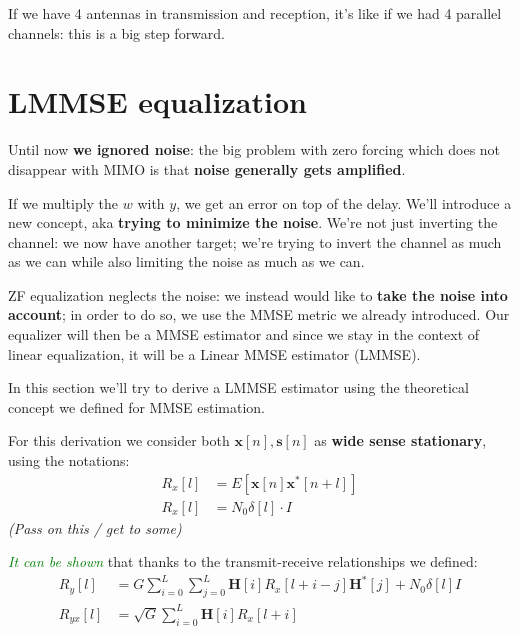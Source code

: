 \documentclass[a4paper, 12pt]{book}
\begin{document}
If we have 4 antennas in transmission and reception, it's like if we had 4 parallel channels: this is a big step forward.

\section{LMMSE equalization}

\begin{center}
\end{center}

Until now \textbf{we ignored noise}: the big problem with zero forcing which does not disappear with MIMO is that \textbf{noise generally gets amplified}.

If we multiply the $w$ with $y$, we get an error on top of the delay. We'll introduce a new concept, aka \textbf{trying to minimize the noise}. We're not just inverting the channel: we now have another target; we're trying to invert the channel as much as we can while also limiting the noise as much as we can.

ZF equalization neglects the noise: we instead would like to \textbf{take the noise into account}; in order to do so, we use the MMSE metric we already introduced. Our equalizer will then be a MMSE estimator and since we stay in the context of linear equalization, it will be a Linear MMSE estimator (LMMSE).

In this section we'll try to derive a LMMSE estimator using the theoretical concept we defined for MMSE estimation.

For this derivation we consider both $\mathbf{x}[n], \mathbf{s}[n]$ as \textbf{wide sense stationary}, using the notations:
\begin{align}
    R_x[l] &= E[\mathbf{x}[n]\mathbf{x}^*[n+l]] \\
    R_x[l] &= N_0 \delta[l] \cdot I
\end{align}
\textit{\footnotesize (Pass on this / get to some)}

\textit{\textcolor{green}{It can be shown}} that thanks to the transmit-receive relationships we defined:
\begin{align}
    R_y[l] &= G \sum_{i=0}^{L} \sum_{j=0}^{L} \mathbf{H}[i] R_x[l+i-j] \mathbf{H}^*[j] + N_0 \delta[l] I \label{eq:2.154} \\
    R_{yx}[l] &= \sqrt{G} \sum_{i=0}^{L} \mathbf{H}[i] R_x[l+i] \label{eq:2.158}
\end{align}
\end{document}
